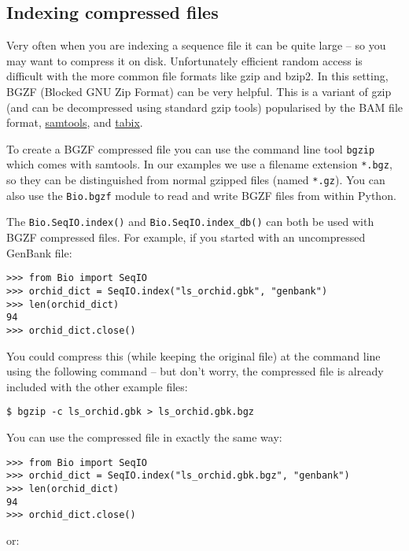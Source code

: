 \subsection{Indexing compressed files}
\label{sec:SeqIO-index-bgzf}

Very often when you are indexing a sequence file it can be quite large -- so
you may want to compress it on disk. Unfortunately efficient random access
is difficult with the more common file formats like gzip and bzip2. In this
setting, BGZF (Blocked GNU Zip Format) can be very helpful. This is a variant
of gzip (and can be decompressed using standard gzip tools) popularised by
the BAM file format, \href{https://www.htslib.org/}{samtools}, and
\href{https://www.htslib.org/doc/tabix.html}{tabix}.

To create a BGZF compressed file you can use the command line tool \verb|bgzip|
which comes with samtools. In our examples we use a filename extension
\verb|*.bgz|, so they can be distinguished from normal gzipped files (named
\verb|*.gz|). You can also use the \verb|Bio.bgzf| module to read and write
BGZF files from within Python.

The \verb|Bio.SeqIO.index()| and \verb|Bio.SeqIO.index_db()| can both be
used with BGZF compressed files. For example, if you started with an
uncompressed GenBank file:

\begin{verbatim}
>>> from Bio import SeqIO
>>> orchid_dict = SeqIO.index("ls_orchid.gbk", "genbank")
>>> len(orchid_dict)
94
>>> orchid_dict.close()
\end{verbatim}

You could compress this (while keeping the original file) at the command
line using the following command -- but don't worry, the compressed file
is already included with the other example files:

\begin{verbatim}
$ bgzip -c ls_orchid.gbk > ls_orchid.gbk.bgz
\end{verbatim}

You can use the compressed file in exactly the same way:

\begin{verbatim}
>>> from Bio import SeqIO
>>> orchid_dict = SeqIO.index("ls_orchid.gbk.bgz", "genbank")
>>> len(orchid_dict)
94
>>> orchid_dict.close()
\end{verbatim}

\noindent
or:

